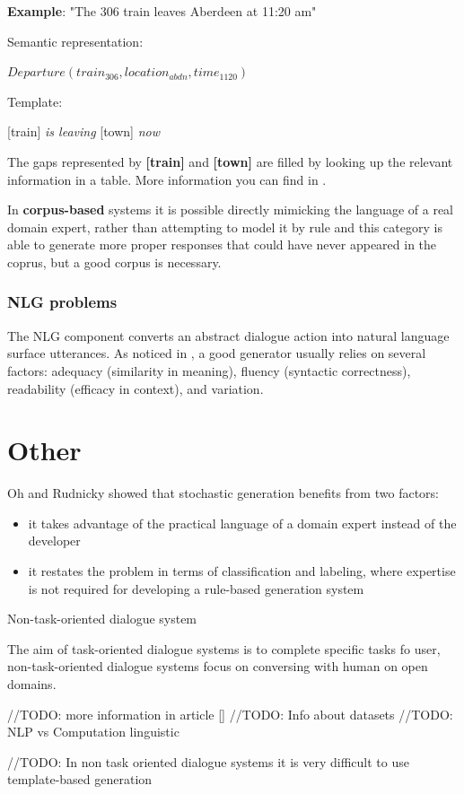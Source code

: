 \begin{center}
\textbf{Example}: "The 306 train leaves Aberdeen at 11:20 am"

\vspace{5mm}
Semantic representation: 

$Departure(train_{306}, location_{abdn}, time_{1120})$

\vspace{5mm}
Template: 

[train] \textit{is leaving} [town] \textit{now}
\end{center}
The gaps represented by \textbf{[train]} and \textbf{[town]} are filled by looking up the relevant
information in a table. More information you can find in \cite{applied_nlg}.

In \textbf{corpus-based} systems it is possible directly mimicking the language of a real domain expert, rather than attempting to model it by rule and this category is able to generate more proper responses that could have never appeared in the coprus, but a good corpus is necessary. 
\cite{stochastic_language_generation_ds} \cite{survey_on_ds}

\subsection*{NLG problems}
The NLG component converts an abstract dialogue action into natural language surface utterances. As noticed in \cite{generator_problems}, a good generator usually relies on several factors: adequacy (similarity in meaning), fluency (syntactic correctness), readability (efficacy in context), and variation.

\chapter{Other}
Oh and Rudnicky showed that stochastic generation benefits from two factors: 
\begin{itemize}
  \item it takes advantage of the practical language of a domain expert instead of the developer
  \item it restates the problem in terms of classification and labeling, where expertise is not required for developing a rule-based generation system
\end{itemize}

Non-task-oriented dialogue system

The aim of task-oriented dialogue systems is to complete specific tasks fo user, non-task-oriented dialogue systems focus on conversing with human on open domains. 

//TODO: more information in article []
//TODO: Info about datasets
//TODO: NLP vs Computation linguistic

//TODO: In non task oriented dialogue systems it is very difficult to use template-based generation
\cite{stochastic_language_generation_ds}
